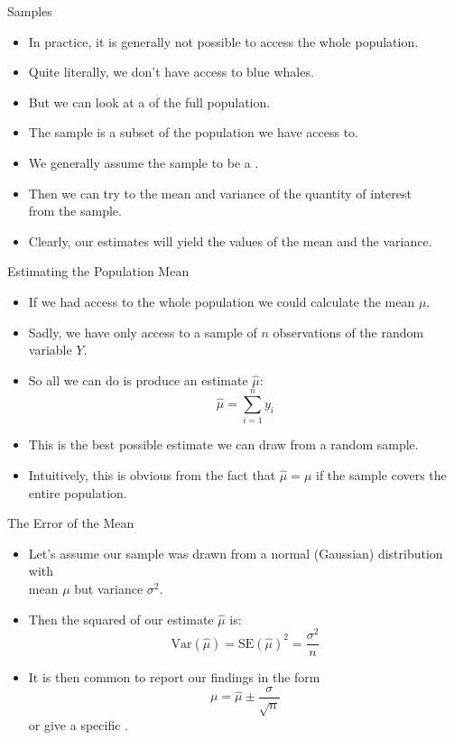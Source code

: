 \documentclass[mathserif, aspectratio=169]{beamer}
\begin{document}
\begin{frame}{Samples}
	\begin{itemize}
		\item In practice, it is generally not possible to access the whole population.
		\item Quite literally, we don't have access to  blue whales.
		\item But we can look at a  of the full population.
		\item The sample is a subset of the population we have access to.
		\item We generally assume the sample to be a .
		\item Then we can try to  the mean and variance of the quantity of interest\\
			from the sample.
		\item Clearly, our estimates will  yield the  values of the mean and the variance.
	\end{itemize}
\end{frame}

\begin{frame}{Estimating the Population Mean}
	\begin{itemize}
		\item If we had access to the whole population we could calculate the  mean $\mu$.
		\item Sadly, we have only access to a sample of $n$ observations of the random variable $Y$.
		\item So all we can do is produce an estimate $\hat{\mu}$:
			\[ \hat{\mu} = \sum_{i=1}^n y_i \]
		\item This is the best possible  estimate we can draw from a random sample.
		\item Intuitively, this is obvious from the fact that $\hat{\mu} = \mu$ if the sample covers
			the entire population.
	\end{itemize}
\end{frame}

\begin{frame}{The Error of the Mean}
	\begin{itemize}
		\item Let's assume our sample was drawn from a normal (Gaussian) distribution with\\
			 mean $\mu$ but  variance $\sigma^2$.
		\item Then the squared  of our estimate $\hat{\mu}$ is:
			\[ \text{Var}(\hat{\mu}) = \text{SE}(\hat{\mu})^2 = \frac{\sigma^2}{n} \]
		\item It is then common to report our findings in the form 
			\[ \mu = \hat{\mu} \pm \frac{\sigma}{\sqrt{n}} \]
			or give a specific .
	\end{itemize}
\end{frame}
\end{document}
